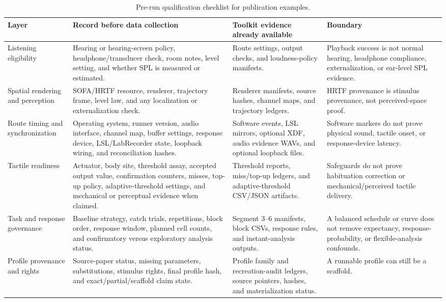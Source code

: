 \documentclass[pdflatex,sn-apa]{sn-jnl}
\begin{document}
\begin{table}[t]
\caption{Pre-run qualification checklist for publication examples.}
\label{tab:pre-run-checklist}
\footnotesize
\setlength{\tabcolsep}{3pt}
\begin{tabularx}{\textwidth}{>{\raggedright\arraybackslash}p{} >{\raggedright\arraybackslash}X >{\raggedright\arraybackslash}p{} >{\raggedright\arraybackslash}p{}}
\toprule
Layer & Record before data collection & Toolkit evidence already available & Boundary \\
\midrule
Listening eligibility & Hearing or hearing-screen policy, headphone/transducer check, room notes, level setting, and whether SPL is measured or estimated. & Route settings, output checks, and loudness-policy manifests. & Playback success is not normal hearing, headphone compliance, externalization, or ear-level SPL evidence. \\
Spatial rendering and perception & SOFA/HRTF resource, renderer, trajectory frame, level law, and any localization or externalization check. & Renderer manifests, source hashes, channel maps, and trajectory ledgers. & HRTF provenance is stimulus provenance, not perceived-space proof. \\
Route timing and synchronization & Operating system, runner version, audio interface, channel map, buffer settings, response device, LSL/LabRecorder state, loopback wiring, and reconciliation hashes. & Software events, LSL mirrors, optional XDF, audio evidence WAVs, and optional loopback files. & Software markers do not prove physical sound, tactile onset, or response-device latency. \\
Tactile readiness & Actuator, body site, threshold assay, accepted output value, confirmation counters, misses, top-up policy, adaptive-threshold settings, and mechanical or perceptual evidence when claimed. & Threshold reports, miss/top-up ledgers, and adaptive-threshold CSV/JSON artifacts. & Safeguards do not prove habituation correction or mechanical/perceived tactile delivery. \\
Task and response governance & Baseline strategy, catch trials, repetitions, block order, response window, planned cell counts, and confirmatory versus exploratory analysis status. & Segment 3--6 manifests, block CSVs, response rules, and instant-analysis outputs. & A balanced schedule or curve does not remove expectancy, response-probability, or flexible-analysis confounds. \\
Profile provenance and rights & Source-paper status, missing parameters, substitutions, stimulus rights, final profile hash, and exact/partial/scaffold claim state. & Profile family and recreation-audit ledgers, source pointers, hashes, and materialization status. & A runnable profile can still be a scaffold. \\
\bottomrule
\end{tabularx}
\end{table}
\end{document}
